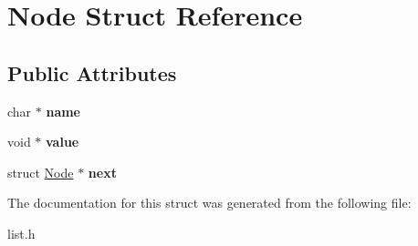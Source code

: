 \hypertarget{structNode}{\section{Node Struct Reference}
\label{structNode}
}
\subsection*{Public Attributes}
\begin{DoxyCompactItemize}
\item 
\hypertarget{structNode_a059a0ea6f86dce9fd919c08a707b360b}{char $\ast$ {\bfseries name}}\label{structNode_a059a0ea6f86dce9fd919c08a707b360b}

\item 
\hypertarget{structNode_a520bf86af21ca233eb9f58e9e28c6576}{void $\ast$ {\bfseries value}}\label{structNode_a520bf86af21ca233eb9f58e9e28c6576}

\item 
\hypertarget{structNode_af67b110ca1a258b793bf69d306929b22}{struct \hyperlink{structNode}{Node} $\ast$ {\bfseries next}}\label{structNode_af67b110ca1a258b793bf69d306929b22}

\end{DoxyCompactItemize}


The documentation for this struct was generated from the following file\-:\begin{DoxyCompactItemize}
\item 
list.\-h\end{DoxyCompactItemize}
